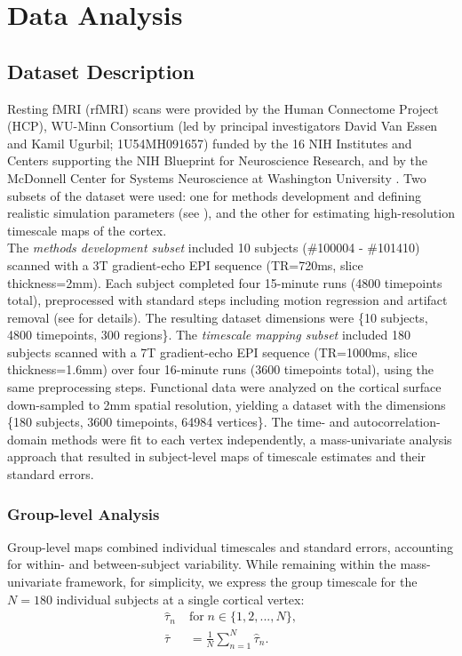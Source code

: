 \documentclass[docs/main.tex]{subfiles}
\begin{document}
\section{Data Analysis}

\subsection{Dataset Description}\label{sec:dataset-description}

Resting fMRI (rfMRI) scans were provided by the Human Connectome Project (HCP), WU-Minn Consortium (led by principal investigators David Van Essen and Kamil Ugurbil; 1U54MH091657) funded by the 16 NIH Institutes and Centers supporting the NIH Blueprint for Neuroscience Research, and by the McDonnell Center for Systems Neuroscience at Washington University \citep{van_essen_wu-minn_2013}. Two subsets of the dataset were used: one for methods development and defining realistic simulation parameters (see ), and the other for estimating high-resolution timescale maps of the cortex.\\

The \textit{methods development subset} included 10 subjects  (\#100004 - \#101410) scanned with a 3T gradient-echo EPI sequence (TR=720ms, slice thickness=2mm). Each subject completed four 15-minute runs (4800 timepoints total), preprocessed with standard steps including motion regression and artifact removal (see \citet{glasser_minimal_2013} for details). The resulting dataset dimensions were \{10 subjects, 4800 timepoints, 300 regions\}. The \textit{timescale mapping subset} included 180 subjects scanned with a 7T gradient-echo EPI sequence (TR=1000ms, slice thickness=1.6mm) over four 16-minute runs (3600 timepoints total), using the same preprocessing steps. Functional data were analyzed on the cortical surface down-sampled to 2mm spatial resolution, yielding a dataset with the dimensions \{180 subjects, 3600 timepoints, 64984 vertices\}. The time- and autocorrelation-domain methods were fit to each vertex independently, a mass-univariate analysis approach that resulted in subject-level maps of timescale estimates and their standard errors.\\

\subsubsection{Group-level Analysis}\label{sec:group-level-analysis}
Group-level maps combined individual timescales and standard errors, accounting for within- and between-subject variability. While remaining within the mass-univariate framework, for simplicity, we express the group timescale for the $N=180$ individual subjects at a single cortical vertex:
\begin{align}
    \hat\tau_n \; &\text{for} \; n\in\{1, 2, ..., N\},\\
    \bar\tau &= \frac{1}{N} \sum_{n=1}^N \hat\tau_n.
\end{align}
\end{document}
